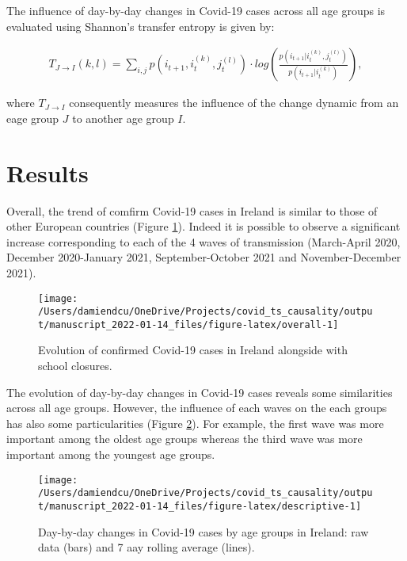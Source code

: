 \documentclass[]{elsarticle} %
\begin{document}
The influence of day-by-day changes in Covid-19 cases across all age groups is evaluated using Shannon's transfer entropy is given by:

\begin{align}
  T_{J \rightarrow I}(k,l) = \sum_{i,j} p\left(i_{t+1}, i_t^{(k)}, j_t^{(l)}\right) \cdot log \left(\frac{p\left(i_{t+1}| i_t^{(k)}, j_t^{(l)}\right)}{p\left(i_{t+1}|i_t^{(k)}\right)}\right),
\end{align}

\noindent where \(T_{J\rightarrow I}\) consequently measures the influence of the change dynamic from an eage group \(J\) to another age group \(I\).

\hypertarget{results}{%
\section{Results}\label{results}}

Overall, the trend of comfirm Covid-19 cases in Ireland is similar to those of other European countries (Figure \ref{fig:overall}). Indeed it is possible to observe a significant increase corresponding to each of the 4 waves of transmission (March-April 2020, December 2020-January 2021, September-October 2021 and November-December 2021).

\begin{figure}[!h]
\texttt{[image: /Users/damiendcu/OneDrive/Projects/covid\_ts\_causality/output/manuscript\_2022-01-14\_files/figure-latex/overall-1]} \caption{Evolution of confirmed Covid-19 cases in Ireland alongside with school closures.}\label{fig:overall}
\end{figure}

The evolution of day-by-day changes in Covid-19 cases reveals some similarities across all age groups. However, the influence of each waves on the each groups has also some particularities (Figure \ref{fig:descriptive}). For example, the first wave was more important among the oldest age groups whereas the third wave was more important among the youngest age groups.

\begin{figure}
\texttt{[image: /Users/damiendcu/OneDrive/Projects/covid\_ts\_causality/output/manuscript\_2022-01-14\_files/figure-latex/descriptive-1]} \caption{Day-by-day changes in Covid-19 cases by age groups in Ireland: raw data (bars) and 7 aay rolling average (lines).}\label{fig:descriptive}
\end{figure}
\end{document}
